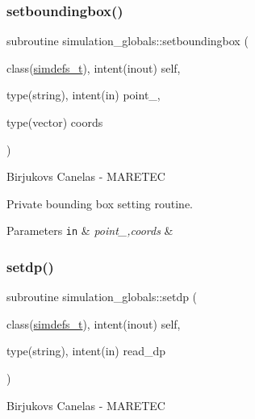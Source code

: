 \subsubsection{\texorpdfstring{setboundingbox()}{setboundingbox()}}
{\footnotesize\ttfamily subroutine simulation\+\_\+globals\+::setboundingbox (\begin{DoxyParamCaption}\item[{class(\mbox{\hyperlink{structsimulation__globals_1_1simdefs__t}{simdefs\+\_\+t}}), intent(inout)}]{self,  }\item[{type(string), intent(in)}]{point\+\_\+,  }\item[{type(vector)}]{coords }\end{DoxyParamCaption})\hspace{0.3cm}{\ttfamily [private]}}



Birjukovs Canelas -\/ M\+A\+R\+E\+T\+EC 

Private bounding box setting routine. 
\begin{DoxyParams}[1]{Parameters}
\mbox{\tt in}  & {\em point\+\_\+,coords} & \\
\hline
\end{DoxyParams}
\mbox{\label{namespacesimulation__globals_a9a8e88c06937b7cf6be9d9bf30f54ba9}} 
\subsubsection{\texorpdfstring{setdp()}{setdp()}}
{\footnotesize\ttfamily subroutine simulation\+\_\+globals\+::setdp (\begin{DoxyParamCaption}\item[{class(\mbox{\hyperlink{structsimulation__globals_1_1simdefs__t}{simdefs\+\_\+t}}), intent(inout)}]{self,  }\item[{type(string), intent(in)}]{read\+\_\+dp }\end{DoxyParamCaption})\hspace{0.3cm}{\ttfamily [private]}}



Birjukovs Canelas -\/ M\+A\+R\+E\+T\+EC 

